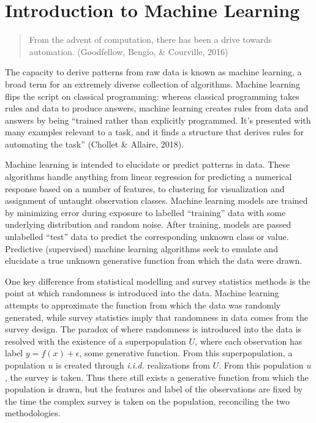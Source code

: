 \documentclass[12pt,twoside]{reedthesis}
\begin{document}
\section{Introduction to Machine
Learning}\label{introduction-to-machine-learning}
\begin{quote}
From the advent of computation, there has been a drive towards
automation. (Goodfellow, Bengio, \& Courville, 2016)
\end{quote}
The capacity to derive patterns from raw data is known as machine
learning, a broad term for an extremely diverse collection of
algorithms. Machine learning flips the script on classical programming:
whereas classical programming takes rules and data to produce answers,
machine learning creates rules from data and answers by being ``trained
rather than explicitly programmed. It's presented with many examples
relevant to a task, and it finds a structure that derives rules for
automating the task'' (Chollet \& Allaire, 2018).

Machine learning is intended to elucidate or predict patterns in data.
These algorithms handle anything from linear regression for predicting a
numerical response based on a number of features, to clustering for
visualization and assignment of untaught observation classes. Machine
learning models are trained by minimizing error during exposure to
labelled ``training'' data with some underlying distribution and random
noise. After training, models are passed unlabelled ``test'' data to
predict the corresponding unknown class or value. Predictive
(supervised) machine learning algorithms seek to emulate and elucidate a
true unknown generative function from which the data were drawn.

One key difference from statistical modelling and survey statistics
methods is the point at which randomness is introduced into the data.
Machine learning attempts to approximate the function from which the
data was randomly generated, while survey statistics imply that
randomness in data comes from the survey design. The paradox of where
randomness is introduced into the data is resolved with the existence of
a superpopulation \(U\), where each observation has label
\(y = f(x) + \epsilon\), some generative function. From this
superpopulation, a population \(u\) is created through \emph{i.i.d.}
realizations from \(U\). From this population \(u\), the survey is
taken. Thus there still exists a generative function from which the
population is drawn, but the features and label of the observations are
fixed by the time the complex survey is taken on the population,
reconciling the two methodologies.
\end{document}

